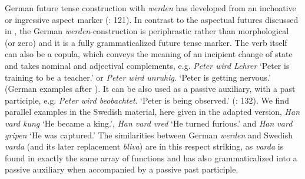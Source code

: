 \documentclass[output=paper,colorlinks,citecolor=brown]{langscibook}
\begin{document}
German future tense construction with \textit{werden} has developed from an inchoative or ingressive aspect marker (\cite{Diewald1997}: 121). In contrast to the aspectual futures discussed in \citet[]{BybeePerkinsPagliuca1994}, the German \textit{werden}-construction is periphrastic rather than morphological (or zero) and it is a fully grammaticalized future tense marker. The verb itself can also be a copula, which conveys the meaning of an incipient change of state and takes nominal and adjectival complements, e.g. \textit{Peter wird Lehrer} ‘Peter is training to be a teacher.’ or \textit{Peter wird unruhig}. ‘Peter is getting nervous.’ (German examples after \cite[132]{Hilpert2008}). It can be also used as a passive auxiliary, with a past participle, e.g. \textit{Peter wird beobachtet}. ‘Peter is being observed.’ (\cite{Hilpert2008}: 132). We find parallel examples in the Swedish material, here given in the adapted version, \textit{Han vard kung }‘He became a king.’, \textit{Han vard vred} ‘He turned furious.’ and \textit{Han vard gripen} ‘He was captured.’ The similarities between German \textit{werden} and Swedish \textit{varda} (and its later replacement \textit{bliva}) are in this respect striking, as \textit{varda} is found in exactly the same array of functions and has also grammaticalized into a passive auxiliary when accompanied by a passive past participle. 
\end{document}
